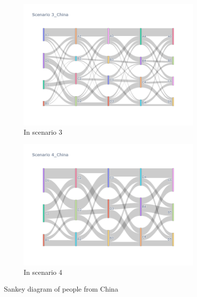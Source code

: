 \begin{figure}[h]
\begin{subfigure}{0.5\textwidth}
    \includegraphics[width=\linewidth]{Figure/figure36c.png}
    \caption{In scenario 3}
    \label{fig36c}
  \end{subfigure}
  \begin{subfigure}{0.5\textwidth}
    \centering
    \includegraphics[width=\linewidth]{Figure/figure36d.png}
    \caption{In scenario 4}
    \label{fig36d}
  \end{subfigure}
  \caption{ Sankey diagram of people from China}
  \label{fig36}
\end{figure}


